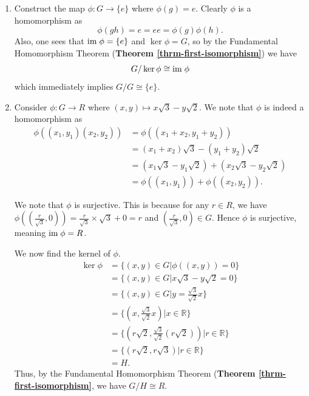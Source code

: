 \begin{enumerate}
    \item Construct the map $\phi: G \to \{e\}$ where $\phi(g) = e$. Clearly $\phi$ is a homomorphism as
    \[
        \phi(gh) = e = ee = \phi(g)\phi(h).
    \]
    Also, one sees that $\mathrm{im}\;\phi = \{e\}$ and $\ker\phi = G$, so by the Fundamental Homomorphism Theorem (\textbf{Theorem \ref{thrm-first-isomorphism}}) we have
    \[
        G / \ker\phi \cong \mathrm{im}\;\phi
    \]
    which immediately implies $G/G \cong \{e\}$.

    \item Consider $\phi: G \to R$ where $(x, y) \mapsto x\sqrt3 - y\sqrt2$. We note that $\phi$ is indeed a homomorphism as
    \begin{align*}
        \phi((x_1,y_1)(x_2,y_2)) &= \phi((x_1+x_2,y_1+y_2))\\
        &= (x_1+x_2)\sqrt3 - (y_1+y_2)\sqrt2\\
        &= (x_1\sqrt3 - y_1\sqrt2) + (x_2\sqrt3 - y_2\sqrt2)\\
        &= \phi((x_1, y_1)) + \phi((x_2, y_2)).
    \end{align*}
    
    We note that $\phi$ is surjective. This is because for any $r \in R$, we have $\phi((\frac{r}{\sqrt3}, 0)) = \frac{r}{\sqrt3} \times \sqrt3 + 0 = r$ and $(\frac{r}{\sqrt3}, 0) \in G$. Hence $\phi$ is surjective, meaning $\mathrm{im}\;\phi = R$.
    
    We now find the kernel of $\phi$.
    \begin{align*}
        \ker\phi &= \{(x, y) \in G \vert \phi((x, y)) = 0\}\\
        &= \{(x, y) \in G \vert x\sqrt3-y\sqrt2 = 0\}\\
        &= \{(x, y) \in G \vert y = \frac{\sqrt{3}}{\sqrt{2}}x\}\\
        &= \{(x, \frac{\sqrt{3}}{\sqrt{2}}x) \vert x \in \mathbb{R}\}\\
        &= \{(r\sqrt2, \frac{\sqrt{3}}{\sqrt{2}}(r\sqrt2)) \vert r \in \mathbb{R}\}\\
        &= \{(r\sqrt2, r\sqrt3) \vert r \in \mathbb{R}\}\\
        &= H.
    \end{align*}
    Thus, by the Fundamental Homomorphism Theorem (\textbf{Theorem \ref{thrm-first-isomorphism}}, we have $G / H \cong R$.


\end{enumerate}
